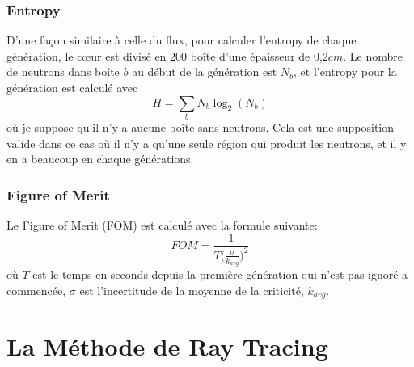 \documentclass{article}
\begin{document}
			\subsubsection{Entropy}
			D'une façon similaire à celle du flux, pour calculer l'entropy de chaque génération, le cœur est divisé en 200 boîte d'une épaisseur de 0,2$cm$. Le nombre de neutrons dans boîte $b$ au début de la génération est $N_b$, et l'entropy pour la génération est calculé avec
			\begin{equation*}
				H = \sum_{b} N_b \log_2(N_b)
			\end{equation*}
			où je suppose qu'il n'y a aucune boîte sans neutrons. Cela est une supposition valide dans ce cas où il n'y a qu'une seule région qui produit les neutrons, et il y en a beaucoup en chaque générations.
			
			\subsubsection{Figure of Merit}
			Le Figure of Merit (FOM) est calculé avec la formule suivante:
			\begin{equation*}
				FOM = \frac{1}{T\big(\frac{\sigma}{k_{avg}}\big)^2}
			\end{equation*}
			où $T$ est le temps en seconds depuis la première génération qui n'est pas ignoré a commencée, $\sigma$ est l'incertitude de la moyenne de la criticité, $k_{avg}$.
		
	\section{La Méthode de Ray Tracing}
	
	
	
\end{document}
